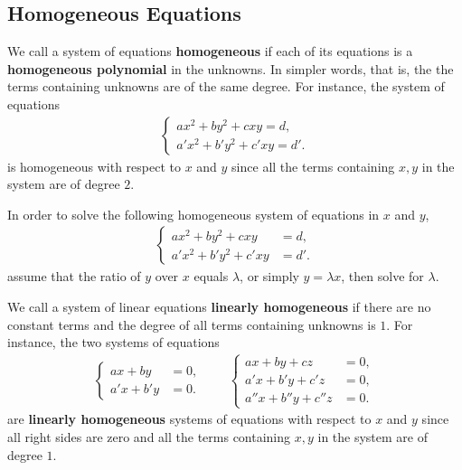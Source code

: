\subsection{Homogeneous Equations}

\begin{tcolorbox}[title={Homogeneous Equations}]
    \begin{definition}
        We call a system of equations \textbf{homogeneous} if each of its equations is a \textbf{homogeneous polynomial} in the unknowns. In simpler words, that is, the the terms containing unknowns are of the same degree. For instance, the system of equations
    \begin{align*}
        \begin{cases}
            ax^2+by^2+cxy=d,\\a'x^2+b'y^2+c'xy=d'.
        \end{cases}
    \end{align*}
    is homogeneous with respect to $x$ and $y$ since all the terms containing $x,y$ in the system are of degree $2$. 
    \end{definition}
    \begin{question}
        In order to solve the following homogeneous system of equations in $x$ and $y$,
        \begin{align*}
            \begin{cases}
                ax^2+by^2+cxy &= d,\\a'x^2+b'y^2+c'xy &=d'.
            \end{cases}
        \end{align*}
        assume that the ratio of $y$ over $x$ equals $\lambda$, or simply $y=\lambda x$, then solve for $\lambda$.
        \begin{definition}
            We call a system of linear equations \textbf{linearly homogeneous} if there are no constant terms and the degree of all terms containing unknowns is $1$. For instance, the two systems of equations
            \begin{align*}
                \begin{cases}
                    ax+by &= 0,\\a'x+b'y &= 0.
                \end{cases} \qquad
                \begin{cases}
                ax+by+cz &= 0,\\a'x+b'y+c'z &= 0,\\ a''x+b''y+c''z &=0.
                \end{cases}
            \end{align*}
            are \textbf{linearly homogeneous} systems of equations with respect to $x$ and $y$ since all right sides are zero and all the terms containing $x,y$ in the system are of degree $1$.
        \end{definition}
    \end{question}
\end{tcolorbox}

